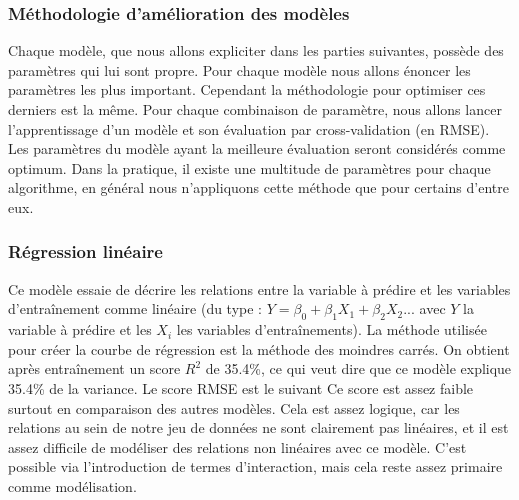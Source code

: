 \documentclass{article} %
\begin{document}
\subsubsection{Méthodologie d'amélioration des modèles}
Chaque modèle, que nous allons expliciter dans les parties suivantes, possède des paramètres qui lui sont propre. Pour chaque modèle nous allons énoncer les paramètres les plus important. Cependant la méthodologie pour optimiser ces derniers est la même. Pour chaque combinaison de paramètre, nous allons lancer l'apprentissage d'un modèle et son évaluation par cross-validation (en RMSE).\\
Les paramètres du modèle ayant la meilleure évaluation seront considérés comme optimum. Dans la pratique, il existe une multitude de paramètres pour chaque algorithme, en général nous n'appliquons cette méthode que pour certains d'entre eux.


\subsubsection{Régression linéaire}
Ce modèle essaie de décrire les relations entre la variable à prédire et les variables d'entraînement comme linéaire (du type : $Y = \beta_0 + \beta_1X_1 + \beta_2X_2 ...$ avec $Y$ la variable à prédire et les $X_i$ les variables d'entraînements). La méthode utilisée pour créer la courbe de régression est la méthode des moindres carrés. On obtient après entraînement un score $R^2$ de 35.4\%, ce qui veut dire que ce modèle explique 35.4\% de la variance. Le score RMSE est le suivant
Ce score est assez faible surtout en comparaison des autres modèles. Cela est assez logique, car les relations au sein de notre jeu de données ne sont clairement pas linéaires, et il est assez difficile de modéliser des relations non linéaires avec ce modèle. C'est possible via l'introduction de termes d'interaction, mais cela reste assez primaire comme modélisation.
\end{document}
